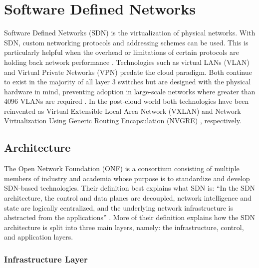 \documentclass[12pt]{article}
\begin{document}



\section{Software Defined Networks} \label{sec:sdn}

Software Defined Networks (SDN) is the virtualization of physical networks. With SDN, custom networking protocols and addressing schemes can be used. This is particularly helpful when the overhead or limitations of certain protocols are holding back network performance \cite{Jennings2015}. Technologies such as virtual LANs (VLAN) \cite{vlan} and Virtual Private Networks (VPN) \cite{vlan} predate the cloud paradigm. Both continue to exist in the majority of all layer 3 switches but are designed with the physical hardware in mind, preventing adoption in large-scale networks where greater than 4096 VLANs are required \cite{wang2015survey}. In the post-cloud world both technologies have been reinvented as Virtual Extensible Local Area Network (VXLAN) \cite{vxlan} and Network Virtualization Using Generic Routing Encapsulation (NVGRE) \cite{nvgre}, respectively.



\subsection{Architecture}

The Open Network Foundation (ONF) is a consortium consisting of multiple members of industry and academia whose purpose is to standardize and develop SDN-based technologies. Their definition best explains what SDN is: ``In the SDN architecture, the control and data planes are decoupled, network intelligence and state are logically centralized, and the underlying network infrastructure is abstracted
from the applications'' \cite{onfSDNdef}. More of their definition explains how the SDN architecture is split into three main layers, namely: the infrastructure, control, and application layers.

\subsubsection{Infrastructure Layer}
\end{document}
